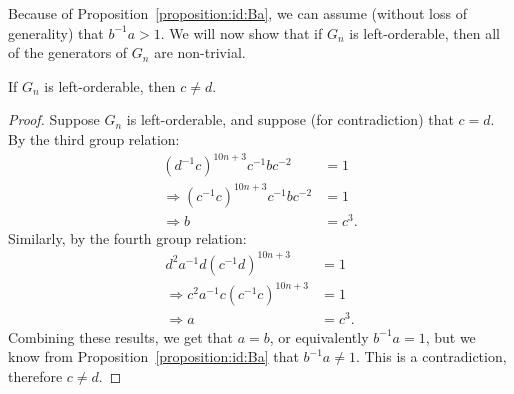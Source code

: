 \noindent{}Because of Proposition~\ref{proposition:id:Ba}, we can assume (without loss of generality) that $b^{-1}a>1$. We will now show that if $G_n$ is left-orderable, then all of the generators of $G_n$ are non-trivial.

\begin{proposition}
If $G_n$ is left-orderable, then $c\neq d$.
\label{proposition:id:Dc}
\end{proposition}
\begin{proof} Suppose $G_n$ is left-orderable, and suppose (for contradiction) that $c=d$. By the third group relation:
\begin{align}
(d^{-1}c)^{10n+3}c^{-1}bc^{-2} & =1\nonumber\\
\Rightarrow(c^{-1}c)^{10n+3}c^{-1}bc^{-2} & =1\nonumber\\
\Rightarrow b & =c^{3}.\nonumber
\end{align}
Similarly, by the fourth group relation:
\begin{align}
d^{2}a^{-1}d(c^{-1}d)^{10n+3} & =1\nonumber\\
\Rightarrow c^{2}a^{-1}c(c^{-1}c)^{10n+3} & =1\nonumber\\
\Rightarrow a & =c^{3}.\nonumber
\end{align}
Combining these results, we get that $a=b$, or equivalently $b^{-1}a=1$,
but we know from Proposition~\ref{proposition:id:Ba} that $b^{-1}a\neq1$. This is a contradiction, therefore $c\neq{}d$.
\end{proof}


